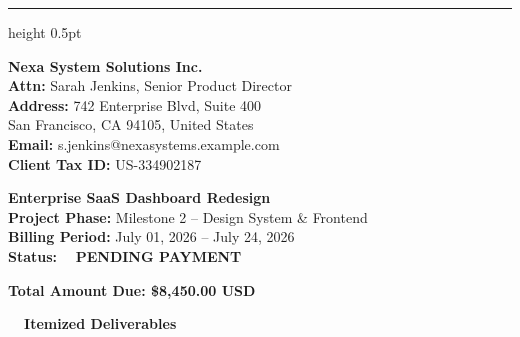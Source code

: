 \documentclass[10pt,a4paper]{article}
\begin{document}
\vspace{5pt}
{\color{BorderGray}\hrule height 0.5pt}
\vspace{5pt}

\begin{minipage}[t]{0.485\textwidth}
    \begin{tcolorbox}[title=\color{AccentColor}\faUser\ \ BILLED TO, colbacktitle=AccentLight, colframe=BorderGray, coltitle=AccentColor]
        {\large \bfseries \color{PrimaryDark} Nexa System Solutions Inc.}\\[2pt]
        \color{SecondaryGray}\small
        \textbf{Attn:} Sarah Jenkins, Senior Product Director\\
        \textbf{Address:} 742 Enterprise Blvd, Suite 400\\
        San Francisco, CA 94105, United States\\
        \textbf{Email:} s.jenkins@nexasystems.example.com\\
        \textbf{Client Tax ID:} US-334902187
    \end{tcolorbox}
\end{minipage}%
\hfill
\begin{minipage}[t]{0.485\textwidth}
    \begin{tcolorbox}[title=\color{AccentColor}\faInfoCircle\ \ PROJECT SUMMARY, colbacktitle=AccentLight, colframe=BorderGray, coltitle=AccentColor]
        {\large \bfseries \color{PrimaryDark} Enterprise SaaS Dashboard Redesign}\\[2pt]
        \color{SecondaryGray}\small
        \textbf{Project Phase:} Milestone 2 -- Design System \& Frontend\\
        \textbf{Billing Period:} July 01, 2026 -- July 24, 2026\\
        \textbf{Status:} \color{SuccessGreen}\faClock\ \ \textbf{PENDING PAYMENT}\\[2pt]
        \begin{tcolorbox}[colback=SuccessGreen!10, colframe=SuccessGreen!40, top=2pt, bottom=2pt, left=4pt, right=4pt]
            \centering \bfseries \color{SuccessGreen} Total Amount Due: \$8,450.00 USD
        \end{tcolorbox}
    \end{tcolorbox}
\end{minipage}

\vspace{6pt}

{\large \bfseries \color{PrimaryDark} \faList\ \ Itemized Deliverables}
\vspace{3pt}
\end{document}
